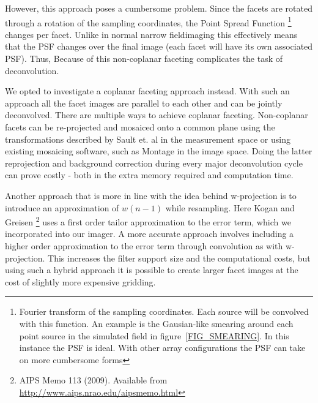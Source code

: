 \documentclass[a4paper,10pt]{article}
\begin{document}
However, this approach poses a cumbersome problem. Since the facets are rotated through a rotation of the sampling coordinates, 
the Point Spread Function \footnote {Fourier transform of the sampling coordinates. Each source will be convolved with this function.
An example is the Gausian-like smearing around each point source in the simulated field in figure~\ref{FIG_SMEARING}. In this instance
the PSF is ideal. With other array configurations the PSF can take on more cumbersome forms} changes per facet. Unlike in normal 
narrow fieldimaging this effectively means that the PSF changes over the final image (each facet will have its own associated PSF). Thus, 
Because of this non-coplanar faceting complicates the task of deconvolution. 

We opted to investigate a coplanar faceting approach instead. With such an approach all the facet images are parallel to 
each other and can be jointly deconvolved. There are multiple ways to achieve coplanar faceting. Non-coplanar facets can be
re-projected and mosaiced onto a common plane using the transformations described by Sault et. al \cite{sault1996approach} in the measurement space 
or using existing mosaicing software, such as Montage \cite{jacob2004montage} in the image space. Doing the latter reprojection and 
background correction during every major deconvolution cycle can prove costly - both in the extra memory required and 
computation time.

Another approach that is more in line with the idea behind w-projection is to introduce an approximation of $w(n-1)$ while resampling.
Here Kogan and Greisen \footnote{AIPS Memo 113 (2009). Available from \url{http://www.aips.nrao.edu/aipsmemo.html}} uses a first order
tailor approximation to the error term, which we incorporated into our imager. A more accurate approach involves including a higher
order approximation to the error term through convolution as with w-projection. This increases the filter support size and the 
computational costs, but using such a hybrid approach it is possible to create larger facet images at the cost of slightly more
expensive gridding.
\end{document}
